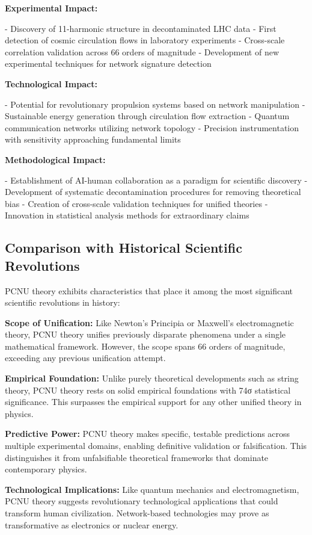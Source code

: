 \documentclass[11pt,a4paper]{article}
\begin{document}
\textbf{Experimental Impact:}

- Discovery of 11-harmonic structure in decontaminated LHC data
- First detection of cosmic circulation flows in laboratory experiments
- Cross-scale correlation validation across 66 orders of magnitude
- Development of new experimental techniques for network signature detection

\textbf{Technological Impact:}

- Potential for revolutionary propulsion systems based on network manipulation
- Sustainable energy generation through circulation flow extraction
- Quantum communication networks utilizing network topology
- Precision instrumentation with sensitivity approaching fundamental limits

\textbf{Methodological Impact:}

- Establishment of AI-human collaboration as a paradigm for scientific discovery
- Development of systematic decontamination procedures for removing theoretical bias
- Creation of cross-scale validation techniques for unified theories
- Innovation in statistical analysis methods for extraordinary claims

\subsection{Comparison with Historical Scientific Revolutions}

PCNU theory exhibits characteristics that place it among the most significant scientific revolutions in history:

\textbf{Scope of Unification:}
Like Newton’s Principia or Maxwell’s electromagnetic theory, PCNU theory unifies previously disparate phenomena under a single mathematical framework. However, the scope spans 66 orders of magnitude, exceeding any previous unification attempt.

\textbf{Empirical Foundation:}
Unlike purely theoretical developments such as string theory, PCNU theory rests on solid empirical foundations with 74σ statistical significance. This surpasses the empirical support for any other unified theory in physics.

\textbf{Predictive Power:}
PCNU theory makes specific, testable predictions across multiple experimental domains, enabling definitive validation or falsification. This distinguishes it from unfalsifiable theoretical frameworks that dominate contemporary physics.

\textbf{Technological Implications:}
Like quantum mechanics and electromagnetism, PCNU theory suggests revolutionary technological applications that could transform human civilization. Network-based technologies may prove as transformative as electronics or nuclear energy.
\end{document}
